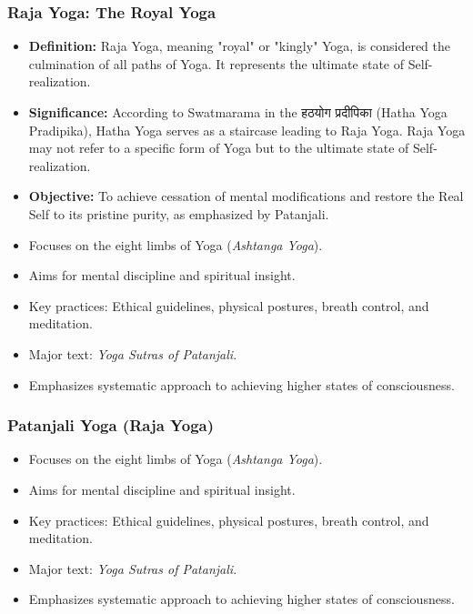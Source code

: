 \begin{frame}[fragile]\frametitle{Raja Yoga: The Royal Yoga}
    
      \begin{itemize}
	  \item \textbf{Definition:} Raja Yoga, meaning "royal" or "kingly" Yoga, is considered the culmination of all paths of Yoga. It represents the ultimate state of Self-realization.
	  \item  \textbf{Significance:} According to Swatmarama in the हठयोग प्रदीपिका (Hatha Yoga Pradipika), Hatha Yoga serves as a staircase leading to Raja Yoga. Raja Yoga may not refer to a specific form of Yoga but to the ultimate state of Self-realization.
	  \item \textbf{Objective:} To achieve cessation of mental modifications and restore the Real Self to its pristine purity, as emphasized by Patanjali.
		\item Focuses on the eight limbs of Yoga (\textit{Ashtanga Yoga}).
		\item Aims for mental discipline and spiritual insight.
		\item Key practices: Ethical guidelines, physical postures, breath control, and meditation.
		\item Major text: \textit{Yoga Sutras of Patanjali}.
		\item Emphasizes systematic approach to achieving higher states of consciousness.
	  \end{itemize}
    
\end{frame}



\begin{frame}[fragile]\frametitle{Patanjali Yoga (Raja Yoga)}

      \begin{itemize}
		\item Focuses on the eight limbs of Yoga (\textit{Ashtanga Yoga}).
		\item Aims for mental discipline and spiritual insight.
		\item Key practices: Ethical guidelines, physical postures, breath control, and meditation.
		\item Major text: \textit{Yoga Sutras of Patanjali}.
		\item Emphasizes systematic approach to achieving higher states of consciousness.
	  \end{itemize}

\end{frame}

